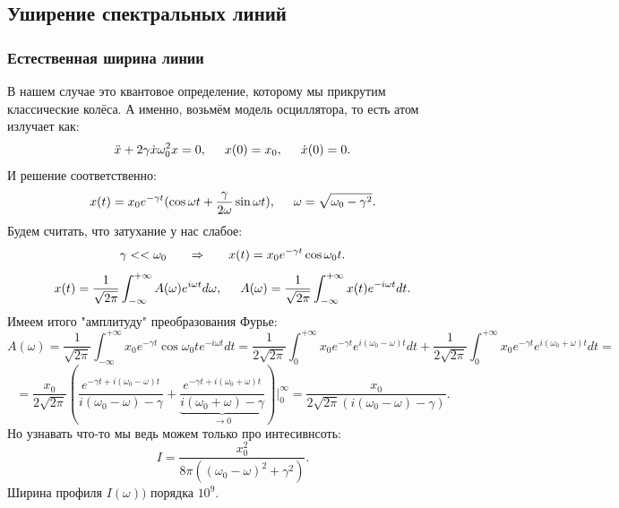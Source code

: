 \subsection*{Уширение спектральных линий}

\subsubsection*{Естественная ширина линии}

В нашем случае это квантовое определение, которому мы прикрутим классические колёса. А именно, возьмём модель осциллятора, то есть атом излучает как:
\begin{equation*}
	\ddot{x} + 2 \gamma \dot{x} \omega_0^2 x = 0,
	\hspace{0.5 cm}
	x(0) = x_0,
	\hspace{0.5 cm}
	\dot{x}(0) = 0.
\end{equation*}
И решение соответственно:
\begin{equation*}
	x(t) = x_0 e^{- \gamma t} (\cos \omega t +\frac{\gamma}{2 \omega}\sin \omega t),
	\hspace{0.5 cm}
	\omega = \sqrt{\omega_0 - \gamma^2}.
\end{equation*}
Будем считать, что затухание у нас слабое:
\begin{equation*}
	\gamma << \omega_0 
	\hspace{0.6 cm}
	\Rightarrow
	\hspace{0.6 cm}
	x(t) = x_0 e^{-\gamma t} \cos \omega_0 t.
\end{equation*}
\begin{equation*}
	x(t) = \frac{1}{\sqrt{2 \pi}} \int_{-\infty}^{+\infty} A(\omega) e^{i \omega t} d\omega,
	\hspace{0.5 cm}
	A(\omega) = \frac{1}{\sqrt{2 \pi}} \int_{-\infty}^{+\infty} x(t) e^{-i \omega t}d t.
\end{equation*}
Имеем итого "амплитуду" преобразования Фурье:
\begin{equation*}
	A(\omega) = \frac{1}{\sqrt{2 \pi}} \int_{-\infty}^{+\infty} x_0 e^{-\gamma t} \cos \omega_0 t e^{-i \omega t}d t
	=
	\frac{1}{2\sqrt{2 \pi}} \int_{0}^{+\infty} x_0 e^{-\gamma t} e^{i(\omega_0 - \omega)t} d t
	+
	\frac{1}{2\sqrt{2 \pi}} \int_{0}^{+\infty} x_0 e^{-\gamma t} e^{i(\omega_0 + \omega)t} d t = 
\end{equation*}
\begin{equation*}
	= \frac{x_0}{2 \sqrt{2 \pi}}
	\left(
	\frac{e^{- \gamma t + i (\omega_0 - \omega)t}}{i (\omega_0 - \omega) - \gamma}
	+
	\underbrace{\frac{e^{- \gamma t + i (\omega_0 + \omega)t}}{i (\omega_0 + \omega) - \gamma}}_{\to 0}
	\right)
	\bigg|_0^\infty = \frac{x_0}{2 \sqrt{2\pi} (i (\omega_0 - \omega) - \gamma)}.
\end{equation*}
Но узнавать что-то мы ведь можем только про интесивнсоть:
\begin{equation*}
	I = \frac{x_0^2}{8 \pi ( (\omega_0 - \omega)^2 + \gamma^2 )}.
\end{equation*}
Ширина профиля $I(\omega))$ порядка $10^9$.


